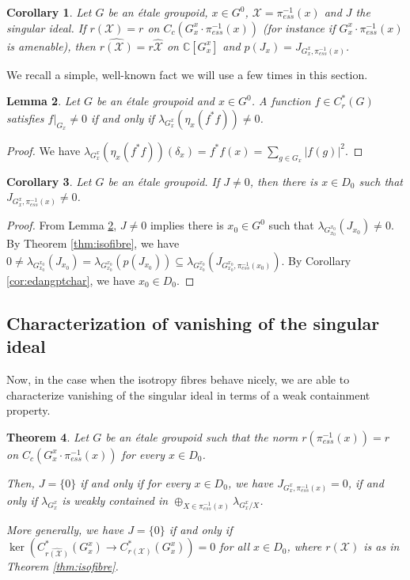 \documentclass[a4paper, 12pt]{amsart}
\newtheorem{thm}{Theorem}[section]
\newtheorem{cor}[thm]{Corollary}
\newtheorem{lem}[thm]{Lemma}
\theoremstyle{definition}
\theoremstyle{remark}
\numberwithin{equation}{section}
\begin{document}
\begin{cor}
\label{cor:isofibrewhenregular}
Let $G$ be an \'etale groupoid, $x\in G^{0}$, $\mathcal{X} = \pi^{-1}_{ess}(x)$ and $J$ the singular ideal. If $r(\mathcal{X}) = r$ on $C_{c}(G^{x}_{x}\cdot \pi^{-1}_{ess}(x))$ (for instance if $G^{x}_{x}\cdot\pi^{-1}_{ess}(x)$ is amenable), then $\widehat{r(\mathcal{X})} = r\hat{\mathcal{X}}$ on $\mathbb{C}[G^{x}_{x}]$ and $p(J_{x}) = J_{G^{x}_{x}, \pi^{-1}_{ess}(x)}$.
\end{cor}

We recall a simple, well-known fact we will use a few times in this section.

\begin{lem}
\label{lem:simplelem}
Let $G$ be an \'etale groupoid and $x\in G^{0}$. A function $f\in C^{*}_{r}(G)$ satisfies $f|_{G_{x}}\neq 0$ if and only if $\lambda_{G^{x}_{x}}(\eta_{x}(f^{*}f))\neq 0$.
\end{lem}
\begin{proof}
     We have $\lambda_{G^{x}_{x}}(\eta_{x}(f^{*}f))(\delta_{x}) = f^{*}f(x) = \sum_{g\in G_{x}}|f(g)|^{2}$. 
\end{proof}

\begin{cor}
\label{cor:nonzerofibre}
    Let $G$ be an \'etale groupoid. If $J\neq 0$, then there is $x\in D_{0}$ such that $J_{G_{x}^{x},\pi^{-1}_{ess}(x)}\neq 0$.
\end{cor}

\begin{proof}
From Lemma \ref{lem:simplelem}, $J\neq 0$ implies there is $x_{0}\in G^{0}$ such that $\lambda_{G^{x_{0}}_{x_{0}}}(J_{x_{0}})\neq 0$. By Theorem \ref{thm:isofibre}, we have $0\neq \lambda_{G^{x_{0}}_{x_{0}}}(J_{x_{0}}) = \lambda_{G^{x_{0}}_{x_{0}}}(p(J_{x_{0}})) \subseteq \lambda_{G^{x_{0}}_{x_{0}}}(J_{G^{x_{0}}_{x_{0}}, \pi^{-1}_{ess}(x_{0})})$. By Corollary \ref{cor:edangptchar}, we have $x_{0}\in D_{0}$.
\end{proof}

\subsection{Characterization of vanishing of the singular ideal}
\label{ss:charvsing}
Now, in the case when the isotropy fibres behave nicely, we are able to characterize vanishing of the singular ideal in terms of a weak containment property.

\begin{thm}
\label{thm:vsingidealcharwkcont}
    Let $G$ be an \'etale groupoid such that the norm $r(\pi^{-1}_{ess}(x)) = r$ on $C_{c}(G^{x}_{x}\cdot \pi^{-1}_{ess}(x))$ for every $x\in D_{0}$. 
    
    Then, $J = \{0\}$ if and only if for every $x\in D_{0}$, we have $J_{G^{x}_{x}, \pi^{-1}_{ess}(x)} = 0$, if and only if $\lambda_{G^{x}_{x}}$ is weakly contained in $\oplus_{X\in \pi^{-1}_{ess}(x)}\lambda_{G^{x}_{x}/X}$. 
    
    More generally, we have $J = \{0\}$ if and only if $\ker(C^{*}_{\widehat{r(\mathcal{X})}}(G^{x}_{x})\to C^{*}_{r(\mathcal{X})}(G^{x}_{x})) = 0$ for all $x\in D_{0}$, where $r(\mathcal{X})$ is as in Theorem \ref{thm:isofibre}.
\end{thm}
\end{document}
